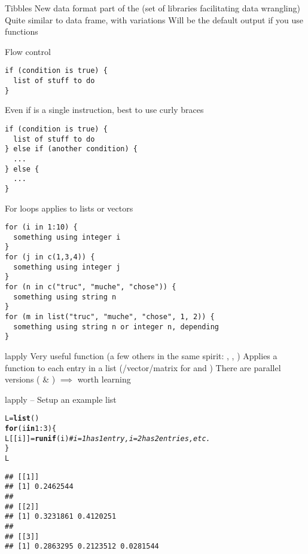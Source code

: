 \documentclass[aspectratio=169]{beamer}\usepackage[]{graphicx}\usepackage[]{xcolor}
\makeatletter
\newcommand{\hlnum}[1]{\textcolor[rgb]{0.686,0.059,0.569}{#1}}%
\newcommand{\hlcom}[1]{\textcolor[rgb]{0.678,0.584,0.686}{\textit{#1}}}%
\newcommand{\hlopt}[1]{\textcolor[rgb]{0,0,0}{#1}}%
\newcommand{\hldef}[1]{\textcolor[rgb]{0.345,0.345,0.345}{#1}}%
\newcommand{\hlkwa}[1]{\textcolor[rgb]{0.161,0.373,0.58}{\textbf{#1}}}%
\newcommand{\hlkwb}[1]{\textcolor[rgb]{0.69,0.353,0.396}{#1}}%
\newcommand{\hlkwd}[1]{\textcolor[rgb]{0.737,0.353,0.396}{\textbf{#1}}}%
\newenvironment{kframe}{%
 \def\at@end@of@kframe{}%
 \ifinner\ifhmode%
  \def\at@end@of@kframe{\end{minipage}}%
  \begin{minipage}{\columnwidth}%
 \fi\fi%
 \def\FrameCommand##1{\hskip\@totalleftmargin \hskip-\fboxsep
 \colorbox{shadecolor}{##1}\hskip-\fboxsep
     \hskip-\linewidth \hskip-\@totalleftmargin \hskip\columnwidth}%
 \MakeFramed {\advance\hsize-\width
   \@totalleftmargin\z@ \linewidth\hsize
   \@setminipage}}%
 {\par\unskip\endMakeFramed%
 \at@end@of@kframe}
\newenvironment{knitrout}{}{} %
\makeatother
\begin{document}
\begin{frame}{Tibbles}
\bbullet
New data format part of the  (set of libraries facilitating data wrangling)
\vfill
\bbullet
Quite similar to data frame, with variations
\vfill
\bbullet Will be the default output if you use  functions
\end{frame}


\begin{frame}[fragile]{Flow control}
\begin{lstlisting}
if (condition is true) {
  list of stuff to do
}
\end{lstlisting}
Even if  is a single instruction, best to use curly braces
\begin{lstlisting}
if (condition is true) {
  list of stuff to do
} else if (another condition) {
  ...
} else {
  ...
}
\end{lstlisting}
\end{frame} 

\begin{frame}[fragile]{For loops}
 applies to lists or vectors
\begin{lstlisting}
for (i in 1:10) {
  something using integer i
}
for (j in c(1,3,4)) {
  something using integer j
}
for (n in c("truc", "muche", "chose")) {
  something using string n
}
for (m in list("truc", "muche", "chose", 1, 2)) {
  something using string n or integer n, depending
}
\end{lstlisting}
\end{frame} 

\begin{frame}[fragile]{lapply}
Very useful function (a few others in the same spirit: , , )
\vfill
Applies a function to each entry in a list (/vector/matrix for  and )
\vfill
There are parallel versions ( \& ) $\implies$ worth learning
\end{frame}

\begin{frame}[fragile]{lapply -- Setup an example list}
\begin{knitrout}
\color{fgcolor}\begin{kframe}
\begin{alltt}
\hldef{L} \hlkwb{=} \hlkwd{list}\hldef{()}
\hlkwa{for} \hldef{(i} \hlkwa{in} \hlnum{1}\hlopt{:}\hlnum{3}\hldef{) \{}
        \hldef{L[[i]]} \hlkwb{=} \hlkwd{runif}\hldef{(i)} \hlcom{# i=1 has 1 entry, i=2 has 2 entries, etc.}
\hldef{\}}
\hldef{L}
\end{alltt}
\begin{verbatim}
## [[1]]
## [1] 0.2462544
## 
## [[2]]
## [1] 0.3231861 0.4120251
## 
## [[3]]
## [1] 0.2863295 0.2123512 0.0281544
\end{verbatim}
\end{kframe}
\end{knitrout}
\end{frame}
\end{document}
